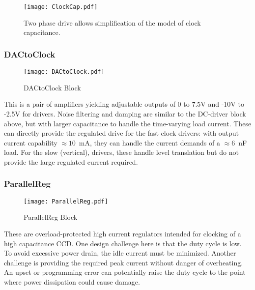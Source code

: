    \begin{figure}[h]
   \begin{center}
   \texttt{[image: ClockCap.pdf]}
   \caption{Two phase drive allows simplification of the model of clock capacitance.}
   \label{ClockCap}
   \end{center}
   \end{figure}

\subsubsection{DACtoClock}

   \begin{figure}
   \begin{center}
   \texttt{[image: DACtoClock.pdf]}
   \end{center}
   \caption{DACtoClock Block}
   \end{figure}


This is a pair of amplifiers yielding adjustable outputs of 0 to 7.5V and -10V to -2.5V for drivers. Noise filtering and damping are similar to the DC-driver block above, but with larger capacitance to handle the time-varying load current. These can directly provide the regulated drive for the fast clock drivers: with output current capability $\approx 10$\ mA, they can handle the current demands of a $\approx 6$\ nF load. For the slow (vertical), drivers, these handle level translation but do not provide the large regulated current required.

\subsubsection{ParallelReg}
   \begin{figure}
   \begin{center}
   \texttt{[image: ParallelReg.pdf]}
   \end{center}
   \caption{ParallelReg Block}
   \end{figure}

These are overload-protected high current regulators intended for clocking of a high capacitance CCD. One design challenge here is that the duty cycle is low. To avoid excessive power drain, the idle current must be minimized. Another challenge is providing the required peak current without danger of overheating. An upset or programming error can  potentially raise the duty cycle to the point where power dissipation could cause damage.

